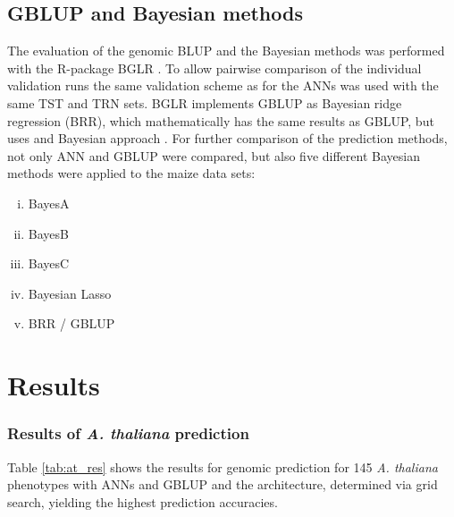 \subsection{GBLUP and Bayesian methods}

The evaluation of the genomic BLUP and the Bayesian methods was performed with the
R-package BGLR \cite{BGLR}. To allow pairwise comparison of the individual validation runs
the same validation scheme as for the ANNs was used with the same TST and TRN sets. BGLR
implements GBLUP as Bayesian ridge regression (BRR), which mathematically has the same
results as GBLUP, but uses and Bayesian approach \cite{BGLR}. For further comparison of
the prediction methods, not only ANN and GBLUP were compared, but also five different
Bayesian methods were applied to the maize data sets:

\onehalfspacing
\begin{enumerate}[(i)]
\item BayesA
\item BayesB
\item BayesC
\item Bayesian Lasso
\item BRR / GBLUP
\end{enumerate}

\doublespacing

\section{Results} \label{res:gp}
\subsubsection{Results of \textit{A. thaliana} prediction}
Table \ref{tab:at_res} shows the results for genomic prediction for 145
\textit{A. thaliana} phenotypes with ANNs and GBLUP and the architecture, determined via
grid search, yielding the highest prediction accuracies.


